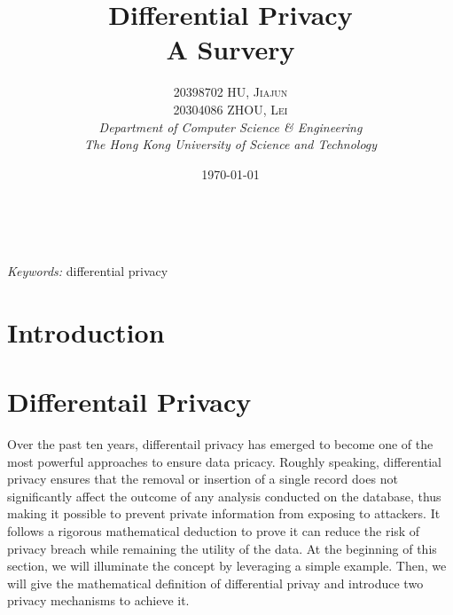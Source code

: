 \documentclass[a4paper, 11pt]{article} %
\title{\textbf{Differential Privacy}\\ %
A Survery} %
\author{\textsc{20398702 HU, Jiajun \\ 20304086 ZHOU, Lei} %
\\{\textit{Department of Computer Science \& Engineering \\ The Hong Kong University of Science and Technology}}} %
\date{\today} %
\makeatletter
\renewcommand{\maketitle}{ %
\begin{flushright} %
{\LARGE\@title} %

\vspace{50pt} %

{\large\@author} %
\\\@date %

\vspace{40pt} %
\end{flushright}
}
\makeatother
\begin{document}
\maketitle %



\begin{abstract}

\end{abstract}

\hspace*{3,6mm}\textit{Keywords:} differential privacy %

\vspace{30pt} %


\section{Introduction}








\section{Differentail Privacy}

Over the past ten years, differentail privacy\cite{dwork2008differential, dwork2014algorithmic} has emerged to become one of the most powerful approaches to ensure data pricacy. Roughly speaking, differential privacy ensures that the removal or insertion of a single record does not significantly affect the outcome of any analysis conducted on the database, thus making it possible to prevent private information from exposing to attackers. It follows a rigorous mathematical deduction to prove it can reduce the risk of privacy breach while remaining the utility of the data. At the beginning of this section, we will illuminate the concept by leveraging a simple example. Then, we will give the mathematical definition of differential privay and introduce two privacy mechanisms to achieve it.
\end{document}
